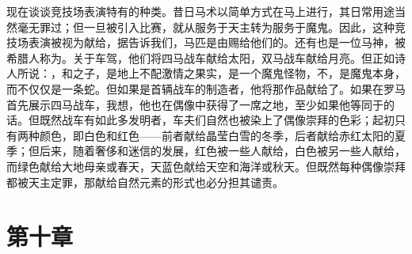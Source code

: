 现在谈谈竞技场表演特有的种类。昔日马术以简单方式在马上进行，其日常用途当然毫无罪过；但一旦被引入比赛，就从服务于天主转为服务于魔鬼。因此，这种竞技场表演被视为献给，据告诉我们，马匹是由赐给他们的。还有也是一位马神，被希腊人称为。关于车驾，他们将四马战车献给太阳，双马战车献给月亮。但正如诗人所说：，和之子，是地上不配激情之果实，是一个魔鬼怪物，不，是魔鬼本身，而不仅仅是一条蛇。但如果是首辆战车的制造者，他将那作品献给了。如果在罗马首先展示四马战车，我想，他也在偶像中获得了一席之地，至少如果他等同于的话。但既然战车有如此多发明者，车夫们自然也被染上了偶像崇拜的色彩；起初只有两种颜色，即白色和红色——前者献给晶莹白雪的冬季，后者献给赤红太阳的夏季；但后来，随着奢侈和迷信的发展，红色被一些人献给，白色被另一些人献给，而绿色献给大地母亲或春天，天蓝色献给天空和海洋或秋天。但既然每种偶像崇拜都被天主定罪，那献给自然元素的形式也必分担其谴责。\par


\section{第十章}

